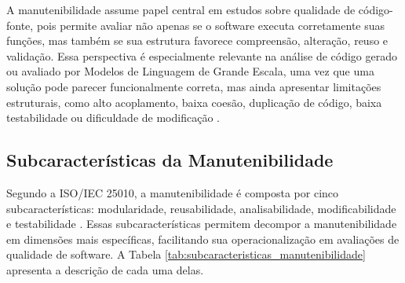 A manutenibilidade assume papel central em estudos sobre qualidade de código-fonte, pois permite avaliar não apenas se o software executa corretamente suas funções, mas também se sua estrutura favorece compreensão, alteração, reuso e validação. Essa perspectiva é especialmente relevante na análise de código gerado ou avaliado por Modelos de Linguagem de Grande Escala, uma vez que uma solução pode parecer funcionalmente correta, mas ainda apresentar limitações estruturais, como alto acoplamento, baixa coesão, duplicação de código, baixa testabilidade ou dificuldade de modificação \cite{LenarduzziEtAll}.

\subsection{Subcaracterísticas da Manutenibilidade}

Segundo a ISO/IEC 25010, a manutenibilidade é composta por cinco subcaracterísticas: modularidade, reusabilidade, analisabilidade, modificabilidade e testabilidade \cite{isoiec25010}. Essas subcaracterísticas permitem decompor a manutenibilidade em dimensões mais específicas, facilitando sua operacionalização em avaliações de qualidade de software. A Tabela \ref{tab:subcaracteristicas_manutenibilidade} apresenta a descrição de cada uma delas.

